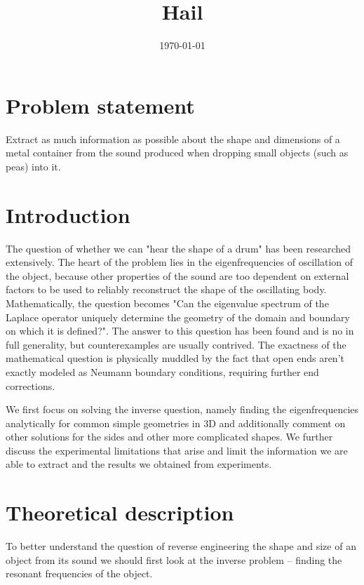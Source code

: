 \documentclass[10pt,a4paper,twocolumn]{article}
\begin{document}
\title{Hail}
\author{\today}
\date{}
\maketitle

\clearpage

\section{Problem statement}

Extract as much information as possible about the shape and dimensions of a metal container from the sound produced when dropping small objects (such as peas) into it.


\section{Introduction}

The question of whether we can "hear the shape of a drum" has been researched extensively.\cite{mathans} \cite{kac} The heart of the problem lies in the eigenfrequencies of oscillation of the object, because other properties of the sound are too dependent on external factors to be used to reliably reconstruct the shape of the oscillating body. Mathematically, the question becomes "Can the eigenvalue spectrum of the Laplace operator uniquely determine the geometry of the domain and boundary on which it is defined?". The answer to this question has been found and is no in full generality, but counterexamples are usually contrived. The exactness of the mathematical question is physically muddled by the fact that open ends aren't exactly modeled as Neumann boundary conditions, requiring further end corrections.

We first focus on solving the inverse question, namely finding the eigenfrequencies analytically for common simple geometries in 3D and additionally comment on other solutions for the sides and other more complicated shapes. We further discuss the experimental limitations that arise and limit the information we are able to extract and the results we obtained from experiments.


\section{Theoretical description}

To better understand the question of reverse engineering the shape and size of an object from its sound we should first look at the inverse problem -- finding the resonant frequencies of the object.
\end{document}
